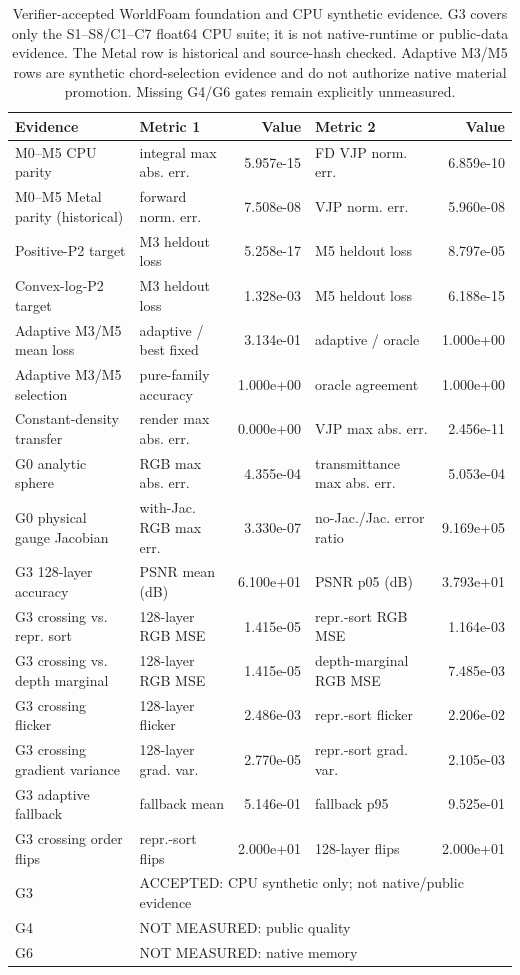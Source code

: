 \begin{table}[t]
\centering
\small
\setlength{\tabcolsep}{4pt}
\begin{tabular}{llrlr}
\toprule
Evidence & Metric 1 & Value & Metric 2 & Value \\
\midrule
M0--M5 CPU parity & integral max abs. err. & 5.957e-15 & FD VJP norm. err. & 6.859e-10 \\
M0--M5 Metal parity (historical) & forward norm. err. & 7.508e-08 & VJP norm. err. & 5.960e-08 \\
Positive-P2 target & M3 heldout loss & 5.258e-17 & M5 heldout loss & 8.797e-05 \\
Convex-log-P2 target & M3 heldout loss & 1.328e-03 & M5 heldout loss & 6.188e-15 \\
Adaptive M3/M5 mean loss & adaptive / best fixed & 3.134e-01 & adaptive / oracle & 1.000e+00 \\
Adaptive M3/M5 selection & pure-family accuracy & 1.000e+00 & oracle agreement & 1.000e+00 \\
Constant-density transfer & render max abs. err. & 0.000e+00 & VJP max abs. err. & 2.456e-11 \\
G0 analytic sphere & RGB max abs. err. & 4.355e-04 & transmittance max abs. err. & 5.053e-04 \\
G0 physical gauge Jacobian & with-Jac. RGB max err. & 3.330e-07 & no-Jac./Jac. error ratio & 9.169e+05 \\
G3 128-layer accuracy & PSNR mean (dB) & 6.100e+01 & PSNR p05 (dB) & 3.793e+01 \\
G3 crossing vs. repr. sort & 128-layer RGB MSE & 1.415e-05 & repr.-sort RGB MSE & 1.164e-03 \\
G3 crossing vs. depth marginal & 128-layer RGB MSE & 1.415e-05 & depth-marginal RGB MSE & 7.485e-03 \\
G3 crossing flicker & 128-layer flicker & 2.486e-03 & repr.-sort flicker & 2.206e-02 \\
G3 crossing gradient variance & 128-layer grad. var. & 2.770e-05 & repr.-sort grad. var. & 2.105e-03 \\
G3 adaptive fallback & fallback mean & 5.146e-01 & fallback p95 & 9.525e-01 \\
G3 crossing order flips & repr.-sort flips & 2.000e+01 & 128-layer flips & 2.000e+01 \\
\midrule
G3 & \multicolumn{4}{l}{ACCEPTED: CPU synthetic only; not native/public evidence} \\
G4 & \multicolumn{4}{l}{NOT MEASURED: public quality} \\
G6 & \multicolumn{4}{l}{NOT MEASURED: native memory} \\
\bottomrule
\end{tabular}
\caption{Verifier-accepted WorldFoam foundation and CPU synthetic evidence. G3 covers only the S1--S8/C1--C7 float64 CPU suite; it is not native-runtime or public-data evidence. The Metal row is historical and source-hash checked. Adaptive M3/M5 rows are synthetic chord-selection evidence and do not authorize native material promotion. Missing G4/G6 gates remain explicitly unmeasured.}
\label{tab:worldfoam-foundation}
\end{table}
